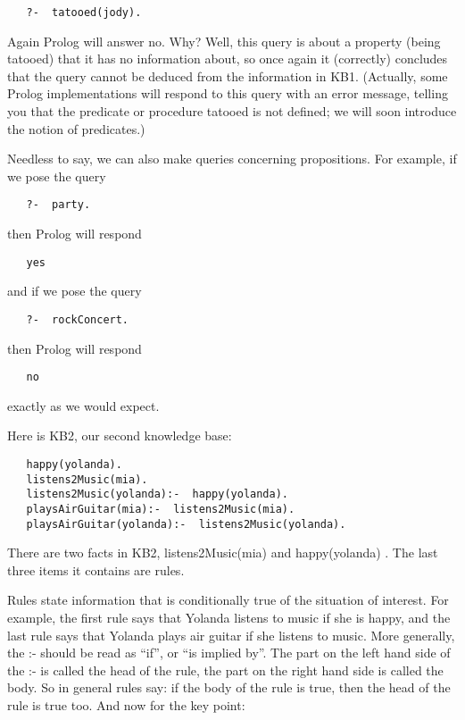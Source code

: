 \begin{verbatim} 
   ?-  tatooed(jody).
\end{verbatim}
   
Again Prolog will answer no. Why? Well, this query is about a property (being
tatooed) that it has no information about, so once again it (correctly)
concludes that the query cannot be deduced from the information in KB1.
(Actually, some Prolog implementations will respond to this query with an error
message, telling you that the predicate or procedure tatooed is not defined; we
will soon introduce the notion of predicates.)

Needless to say, we can also make queries concerning propositions. For example,
if we pose the query

\begin{verbatim} 
   ?-  party.
\end{verbatim}

then Prolog will respond

\begin{verbatim} 
   yes
\end{verbatim}

and if we pose the query

\begin{verbatim} 
   ?-  rockConcert.
\end{verbatim}

then Prolog will respond

\begin{verbatim} 
   no
\end{verbatim}

exactly as we would expect.
   

Here is KB2, our second knowledge base:
\begin{verbatim} 
   happy(yolanda). 
   listens2Music(mia). 
   listens2Music(yolanda):-  happy(yolanda). 
   playsAirGuitar(mia):-  listens2Music(mia). 
   playsAirGuitar(yolanda):-  listens2Music(yolanda).
\end{verbatim}
There are two facts in KB2, listens2Music(mia) and happy(yolanda) . The last
three items it contains are rules.

Rules state information that is conditionally true of the situation of interest.
For example, the first rule says that Yolanda listens to music if she is happy,
and the last rule says that Yolanda plays air guitar if she listens to music.
More generally, the :- should be read as “if”, or “is implied by”. The part on
the left hand side of the :- is called the head of the rule, the part on the
right hand side is called the body. So in general rules say: if the body of the
rule is true, then the head of the rule is true too. And now for the key point:

